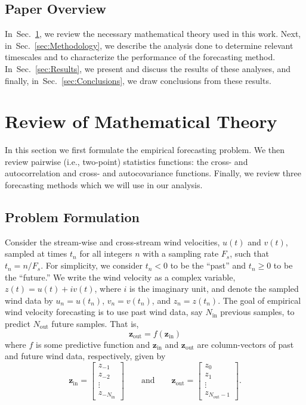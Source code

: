 \documentclass[11pt, oneside]{article}
\newcommand{\secref}[1]{Sec.~\ref{#1}}
\begin{document}
\subsection{Paper Overview}
In~\secref{sec:Theory}, we review the necessary mathematical theory used in this work.
Next, in~\secref{sec:Methodology}, we describe the analysis done to determine relevant timescales and to characterize the performance of the forecasting method.
In~\secref{sec:Results}, we present and discuss the results of these analyses, and finally, in~\secref{sec:Conclusions}, we draw conclusions from these results.

\section{Review of Mathematical Theory}\label{sec:Theory}
In this section we first formulate the empirical forecasting problem.
We then review pairwise (i.e., two-point) statistics functions: the cross- and autocorrelation and cross- and autocovariance functions.
Finally, we review three forecasting methods which we will use in our analysis.

\subsection{Problem Formulation}
Consider the stream-wise and cross-stream wind velocities, $u(t)$ and $v(t)$, sampled at times $t_n$ for all integers $n$ with a sampling rate $F_s$, such that $t_n = n/F_s$.
For simplicity, we consider $t_n < 0$ to be the ``past'' and $t_n \geq 0$ to be the ``future.''
We write the wind velocity as a complex variable, $z(t) = u(t) + i v(t)$, where $i$ is the imaginary unit, and denote the sampled wind data by $u_n = u(t_n)$, $v_n = v(t_n)$, and $z_n = z(t_n)$.
The goal of empirical wind velocity forecasting is to use past wind data, say $N_\text{in}$ previous samples, to predict $N_\text{out}$ future samples.
That is, 
\begin{equation}
\mathbf{z}_\text{out} = f(\mathbf{z}_\text{in})
\end{equation}
where $f$ is some predictive function and $\mathbf{z}_\textrm{in}$ and $\mathbf{z}_\text{out}$ are column-vectors of past and future wind data, respectively, given by
\begin{equation}
\mathbf{z}_\text{in} = 
\begin{bmatrix}
z_{-1} \\ z_{-2} \\ \vdots \\ z_{-N_\text{in}}
\end{bmatrix}
\quad\quad \text{and} \quad\quad
\mathbf{z}_\text{out} = 
\begin{bmatrix}
z_{0} \\ z_{1} \\ \vdots \\ z_{N_\text{out} - 1}
\end{bmatrix}.
\end{equation}
\end{document}
